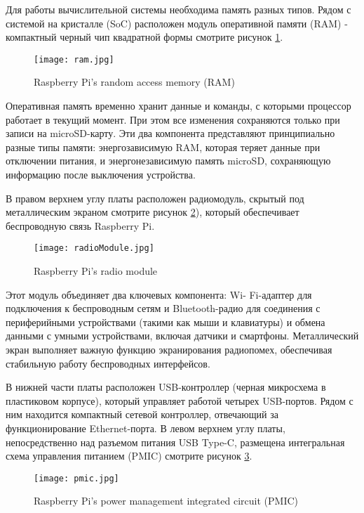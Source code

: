 Для работы вычислительной системы необходима память разных типов. Рядом с системой на кристалле (SoC) расположен модуль оперативной памяти (RAM) - компактный черный чип квадратной формы смотрите рисунок \ref{fig:ram}.

\begin{figure}[H]
	\centering
	\texttt{[image: ram.jpg]}
	\caption{Raspberry Pi’s random access memory (RAM)}
	\label{fig:ram}
\end{figure}

Оперативная память временно хранит данные и команды, с которыми процессор работает в текущий момент. При этом все изменения сохраняются только при записи на microSD-карту. Эти два компонента представляют принципиально разные типы памяти: энергозависимую RAM, которая теряет данные при отключении питания, и энергонезависимую память microSD, сохраняющую информацию после выключения устройства.


В правом верхнем углу платы расположен радиомодуль, скрытый под металлическим экраном смотрите рисунок \ref{fig:radio_module}), который обеспечивает беспроводную связь Raspberry Pi.

\begin{figure}[H]
	\centering
	\texttt{[image: radioModule.jpg]}
	\caption{Raspberry Pi’s radio module}
	\label{fig:radio_module}
\end{figure}

Этот модуль объединяет два ключевых компонента: Wi- Fi-адаптер для подключения к беспроводным сетям и Bluetooth-радио для соединения с периферийными устройствами (такими как мыши и клавиатуры) и обмена данными с умными устройствами, включая датчики и смартфоны. Металлический экран выполняет важную функцию экранирования радиопомех, обеспечивая стабильную работу беспроводных интерфейсов.


В нижней части платы расположен USB-контроллер (черная микросхема в пластиковом корпусе), который управляет работой четырех USB-портов. Рядом с ним находится компактный сетевой контроллер, отвечающий за функционирование Ethernet-порта. В левом верхнем углу платы, непосредственно над разъемом питания USB Type-C, размещена интегральная схема управления питанием (PMIC) смотрите рисунок \ref{fig:pmic}.

\begin{figure}[H]
	\centering
	\texttt{[image: pmic.jpg]}
	\caption{Raspberry Pi’s power management integrated circuit (PMIC)}
	\label{fig:pmic}
\end{figure}

